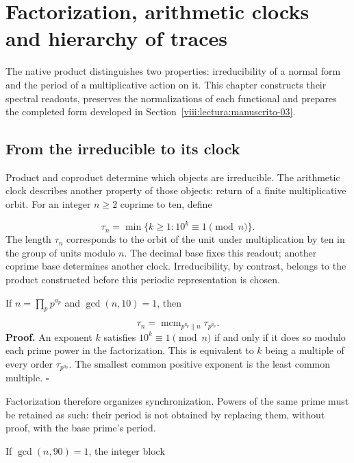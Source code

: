 \section{Factorization, arithmetic clocks and hierarchy of traces}
\label{viii:lectura:manuscrito-02}
The native product distinguishes two properties: irreducibility of a normal form and the period of a multiplicative action on it. This chapter constructs their spectral readouts, preserves the normalizations of each functional and prepares the completed form developed in Section~\ref{viii:lectura:manuscrito-03}.

\subsection{From the irreducible to its clock}
Product and coproduct determine which objects are irreducible. The arithmetic clock describes another property of those objects: return of a finite multiplicative orbit. For an integer $n\ge2$ coprime to ten, define

\[
\tau_n=\min\{k\ge1:10^k\equiv1\pmod n\}.
\]
The length $\tau_n$ corresponds to the orbit of the unit under multiplication by ten in the group of units modulo $n$. The decimal base fixes this readout; another coprime base determines another clock. Irreducibility, by contrast, belongs to the product constructed before this periodic representation is chosen.

If $n=\prod_p p^{a_p}$ and $\gcd(n,10)=1$, then

\[
\tau_n=\operatorname{mcm}_{p^{a_p}\parallel n}\tau_{p^{a_p}}.
\]
\textbf{Proof.} An exponent $k$ satisfies $10^k\equiv1\pmod n$ if and only if it does so modulo each prime power in the factorization. This is equivalent to $k$ being a multiple of every order $\tau_{p^{a_p}}$. The smallest common positive exponent is the least common multiple. \hfill\(\square\)

Factorization therefore organizes synchronization. Powers of the same prime must be retained as such: their period is not obtained by replacing them, without proof, with the base prime's period.

If $\gcd(n,90)=1$, the integer block

